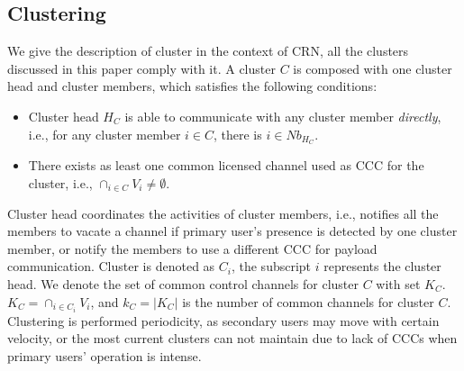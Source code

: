 \documentclass[journal,comsoc]{IEEEtran}
\theoremstyle{mytheoremstyle}
\theoremstyle{mytheoremstyle}
\theoremstyle{mytheoremstyle}
\newcommand{\ie}{i.e., }
\begin{document}
\subsection{Clustering}
\label{def_cluster}
We give the description of cluster in the context of CRN, all the clusters discussed in this paper comply with it.
A cluster $C$ is composed with one cluster head and cluster members, which satisfies the following conditions:
\begin{itemize}
\item Cluster head $H_C$ is able to communicate with any cluster member \textit{directly}, \ie for any cluster member $i\in C$, there is $i\in Nb_{H_C}$.
\item There exists as least one common licensed channel used as CCC for the cluster, \ie $\cap_{i\in C} V_i \neq \emptyset$.
\end{itemize}
Cluster head coordinates the activities of cluster members, \ie notifies all the members to vacate a channel if primary user's presence is detected by one cluster member, or notify the members to use a different CCC for payload communication. 
Cluster is denoted as $C_i$, the subscript $i$ represents the cluster head.
We denote the set of common control channels for cluster $C$ with set $K_C$.
$ K_C = \cap_{i\in C_i} V_i$, and $k_C = |K_C|$ is the number of common channels for cluster $C$.
Clustering is performed periodicity, as secondary users may move with certain velocity, or the most current clusters can not maintain due to lack of CCCs when primary users' operation is intense.






\end{document}
